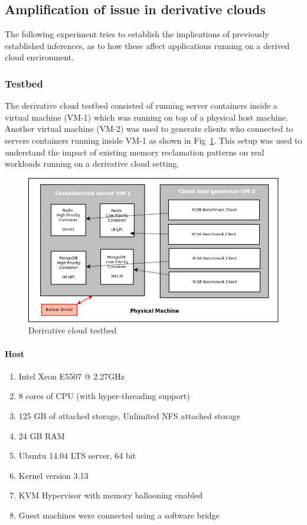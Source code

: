   
    \subsection{Amplification of issue in derivative clouds}
    
      The following experiment tries to establish the implications of previously established inferences, as to how these affect 
applications running on a derived cloud environment.

      \subsubsection{Testbed}
      \label{sec:derivative_testbed}

      The derivative cloud testbed consisted of running server containers inside a virtual machine (VM-1) which was running on top of a 
physical host machine. Another virtual machine (VM-2) was used to generate clients who connected to servers containers running inside VM-1 
as shown in Fig~\ref{img:derived_setup}. This setup was used to understand the impact of existing memory reclamation patterns on real 
workloads running on a derivative cloud setting.
      
      \begin{figure}
	\centering
	\includegraphics[width=1\textwidth]{images/controller_issues/derivative_setup.png}
	\caption{Derivative cloud testbed}
	\label{img:derived_setup}
      \end{figure}
      
      \paragraph{Host}	
	\begin{enumerate}
	  \item Intel Xeon E5507 @ 2.27GHz
	  \item 8 cores of CPU (with hyper-threading support)
	  \item 125 GB of attached storage, Unlimited NFS attached storage 
	  \item 24 GB RAM
	  \item Ubuntu 14.04 LTS server, 64 bit 
	  \item Kernel version 3.13
	  \item KVM Hypervisor with memory ballooning enabled
	  \item Guest machines were connected using a software bridge
	\end{enumerate}
      
